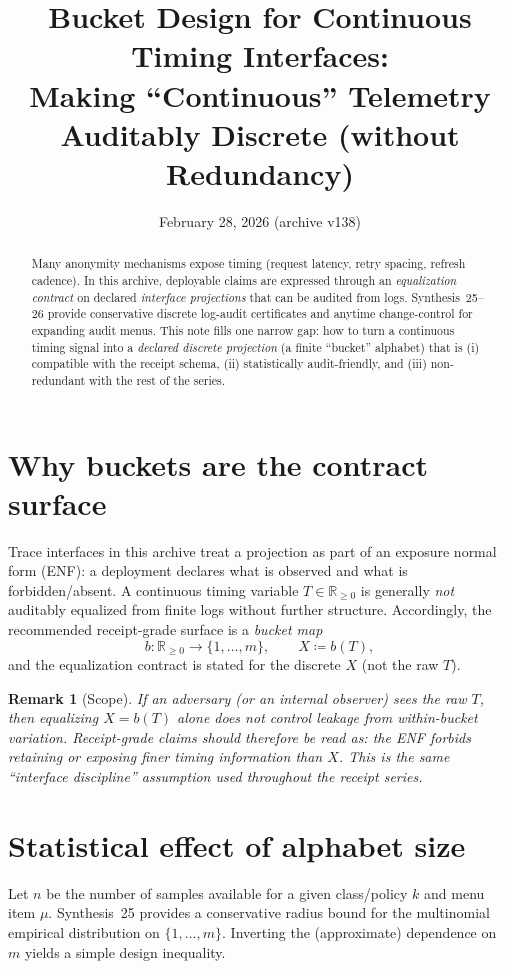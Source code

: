 \documentclass[11pt]{article}
\title{Bucket Design for Continuous Timing Interfaces:\\
\large Making ``Continuous'' Telemetry Auditably Discrete (without Redundancy)}
\author{}
\date{February 28, 2026 (archive v138)}
\newtheorem{remark}{Remark}
\begin{document}
\maketitle

\begin{abstract}
Many anonymity mechanisms expose timing (request latency, retry spacing, refresh cadence).
In this archive, deployable claims are expressed through an \emph{equalization contract} on declared
\emph{interface projections} that can be audited from logs.
Synthesis~25--26 provide conservative discrete log-audit certificates and anytime change-control for expanding audit menus.
This note fills one narrow gap: how to turn a continuous timing signal into a \emph{declared discrete projection} (a finite ``bucket'' alphabet)
that is (i) compatible with the receipt schema, (ii) statistically audit-friendly, and (iii) non-redundant with the rest of the series.
\end{abstract}

\section{Why buckets are the contract surface}
Trace interfaces in this archive treat a projection as part of an exposure normal form (ENF): a deployment declares
what is observed and what is forbidden/absent. \cite{series:traceifaces}
A continuous timing variable $T\in\mathbb{R}_{\ge 0}$ is generally \emph{not} auditably equalized from finite logs without further structure.
Accordingly, the recommended receipt-grade surface is a \emph{bucket map}
\[
b:\mathbb{R}_{\ge 0}\to\{1,\dots,m\},\qquad X \coloneqq b(T),
\]
and the equalization contract is stated for the discrete $X$ (not the raw $T$). \cite{series:profiling,series:stataudit}

\begin{remark}[Scope]
If an adversary (or an internal observer) sees the raw $T$, then equalizing $X=b(T)$ alone does not control leakage from within-bucket variation.
Receipt-grade claims should therefore be read as: \emph{the ENF forbids retaining or exposing finer timing information than $X$}.
This is the same ``interface discipline'' assumption used throughout the receipt series. \cite{series:receiptitems,series:receiptrulebook}
\end{remark}

\section{Statistical effect of alphabet size}
Let $n$ be the number of samples available for a given class/policy $k$ and menu item $\mu$.
Synthesis~25 provides a conservative radius bound for the multinomial empirical distribution on $\{1,\dots,m\}$. \cite{series:stataudit}
Inverting the (approximate) dependence on $m$ yields a simple design inequality.
\end{document}
